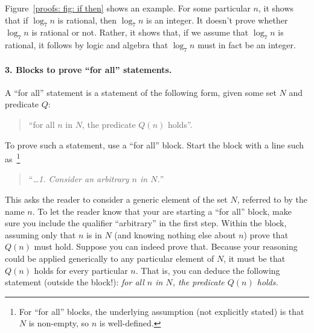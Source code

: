 Figure~\ref{proofs: fig: if then} shows an example.
For some particular $n$, it shows that
if $\log_7 n$ is rational, then $\log_7 n$ is an integer.
It doesn't prove whether $\log_7 n$ is rational or not.
Rather, it shows that, if we assume that $\log_7 n$ is rational,
it follows by logic and algebra that $\log_7 n$ must in fact be an integer.

\paragraph{3. Blocks to prove ``for all'' statements.}
A ``for all'' statement is a statement of the following form,
given some set $N$ and predicate $Q$:
\begin{quote}
``for all $n$ in $N$, the predicate $Q(n)$ holds''.
\end{quote}

To prove such a statement, use a ``for all'' block.
Start the block with a line such as~\footnote
{For ``for all'' blocks, the underlying assumption (not explicitly stated)
  is that $N$ is non-empty, so $n$ is well-defined.}
\begin{quote}
  ``\emph{\ldots 1. Consider an arbitrary $n$ in $N$.}'' 
\end{quote}
This asks the reader to consider a generic element of the set $N$,
referred to by the name $n$.
To let the reader know that your are starting a ``for all'' block,
make sure you include the qualifier ``arbitrary'' in the first step.
Within the block,
assuming only that $n$ is in $N$ (and knowing nothing else about $n$)
prove that $Q(n)$ must hold.
Suppose you can indeed prove that.
Because your reasoning could be applied generically to any particular element of $N$,
it must be that $Q(n)$ holds for every particular $n$.
That is, you can deduce the following statement (outside the block!):
\emph{for all $n$ in $N$, the predicate $Q(n)$ holds.}

